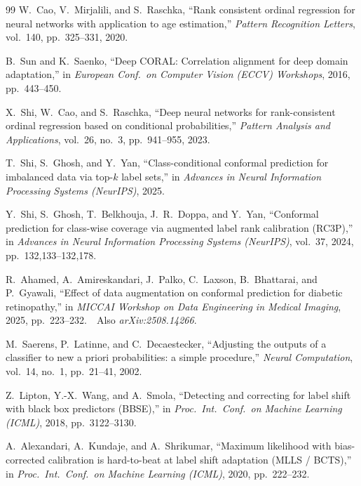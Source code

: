 \documentclass[journal]{IEEEtran}
\begin{document}
\begin{thebibliography}{99}
    W.~Cao, V.~Mirjalili, and S.~Raschka, ``Rank consistent ordinal regression for neural networks with application to age estimation,'' \emph{Pattern Recognition Letters}, vol.\ 140, pp.\ 325--331, 2020.

    B.~Sun and K.~Saenko, ``Deep CORAL: Correlation alignment for deep domain adaptation,'' in \emph{European Conf.\ on Computer Vision (ECCV) Workshops}, 2016, pp.\ 443--450.

    X.~Shi, W.~Cao, and S.~Raschka, ``Deep neural networks for rank-consistent ordinal regression based on conditional probabilities,'' \emph{Pattern Analysis and Applications}, vol.\ 26, no.\ 3, pp.\ 941--955, 2023.

    T.~Shi, S.~Ghosh, and Y.~Yan, ``Class-conditional conformal prediction for imbalanced data via top-$k$ label sets,'' in \emph{Advances in Neural Information Processing Systems (NeurIPS)}, 2025.

    Y.~Shi, S.~Ghosh, T.~Belkhouja, J.~R.\ Doppa, and Y.~Yan, ``Conformal prediction for class-wise coverage via augmented label rank calibration (RC3P),'' in \emph{Advances in Neural Information Processing Systems (NeurIPS)}, vol.\ 37, 2024, pp.\ 132{,}133--132{,}178.

    R.~Ahamed, A.~Amireskandari, J.~Palko, C.~Laxson, B.~Bhattarai, and P.~Gyawali, ``Effect of data augmentation on conformal prediction for diabetic retinopathy,'' in \emph{MICCAI Workshop on Data Engineering in Medical Imaging}, 2025, pp.\ 223--232.\ \ Also \emph{arXiv:2508.14266}.

    M.~Saerens, P.~Latinne, and C.~Decaestecker, ``Adjusting the outputs of a classifier to new a priori probabilities: a simple procedure,'' \emph{Neural Computation}, vol.\ 14, no.\ 1, pp.\ 21--41, 2002.

    Z.~Lipton, Y.-X.\ Wang, and A.~Smola, ``Detecting and correcting for label shift with black box predictors (BBSE),'' in \emph{Proc.\ Int.\ Conf.\ on Machine Learning (ICML)}, 2018, pp.\ 3122--3130.

    A.~Alexandari, A.~Kundaje, and A.~Shrikumar, ``Maximum likelihood with bias-corrected calibration is hard-to-beat at label shift adaptation (MLLS / BCTS),'' in \emph{Proc.\ Int.\ Conf.\ on Machine Learning (ICML)}, 2020, pp.\ 222--232.



\end{thebibliography}
\end{document}
